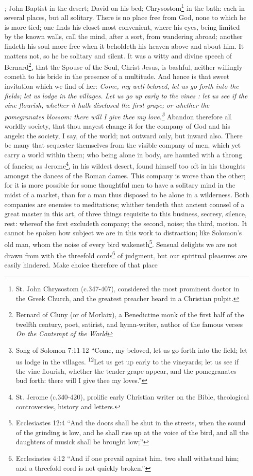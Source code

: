 ; John Baptist in the desert; David on his bed; Chrysostom\footnote{St. John Chrysostom (c.347-407), considered the most prominent doctor in the Greek Church, and the greatest preacher heard in a Christian pulpit.\cite{cath1913}} in the bath: each in several places, but all solitary. There is no place free from God, none to which he is more tied; one finds his closet most convenient, where his eyes, being limited by the known walls, call the mind, after a sort, from wandering abroad; another findeth his soul more free when it beholdeth his heaven above and about him. It matters not, so he be solitary and silent. It was a witty and divine speech of Bernard\footnote{Bernard of Cluny (or of Morlaix), a Benedictine monk of the first half of the twelfth century, poet, satirist, and hymn-writer, author of the famous verses \emph{On the Contempt of the World}\cite{cath1913}}, that the Spouse of the Soul, Christ Jesus, is bashful, neither willingly cometh to his bride in the presence of a multitude. And hence is that sweet invitation which we find of her: \emph{Come, my well beloved, let us go forth into the fields; let us lodge in the villages. Let us go up early to the vines : let us see if the vine flourish, whether it hath disclosed the first grape; or whether the pomegranates blossom: there will I give thee my love.\footnote{Song of Solomon 7:11-12 ``Come, my beloved, let us go forth into the field; let us lodge in the villages. \textsuperscript{12}Let us get up early to the vineyards; let us see if the vine flourish, whether the tender grape appear, and the pomegranates bud forth: there will I give thee my loves.''}} Abandon therefore all worldly society, that thou mayest change it for the company of God and his angels: the society, I say, of the world; not outward only, but inward also. There be many that sequester themselves from the visible company of men, which yet carry a world within them; who being alone in body, are haunted with a throng of fancies; as Jerome\footnote{St. Jerome (c.340-420), prolific early Christian writer on the Bible, theological controversies, history and letters\cite{cath1913}.}, in his wildest desert, found himself too oft in his thoughts amongst the dances of the Roman dames. This company is worse than the other; for it is more possible for some thoughtful men to have a solitary mind in the midst of a market, than for a man thus disposed to be alone in a wilderness. Both companies are enemies to meditations; whither tendeth that ancient connsel of a great master in this art, of three things requisite to this business, secresy, silence, rest: whereof the first excludeth company; the second, noise; the third, motion. It cannot be spoken how subject we are in this work to distraction; like Solomon's old man, whom the noise of every bird wakeneth\footnote{Ecclesiastes 12:4 ``And the doors shall be shut in the streets, when the sound of the grinding is low, and he shall rise up at the voice of the bird, and all the daughters of musick shall be brought low;''}. Sensual delights we are not drawn from with the threefold cords\footnote{Ecclesiastes 4:12 ``And if one prevail against him, two shall withstand him; and a threefold cord is not quickly broken.''} of judgment, but our spiritual pleasures are easily hindered. Make choice therefore of that place 